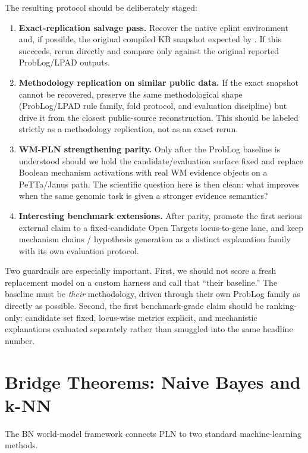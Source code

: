 \documentclass[11pt,openany]{report}
\begin{document}
The resulting protocol should be deliberately staged:
\begin{enumerate}
\item \textbf{Exact-replication salvage pass.}  Recover the native cplint
  environment and, if possible, the original compiled KB snapshot expected by
  .  If this succeeds, rerun
   directly and compare only against the original
  reported ProbLog/LPAD outputs.
\item \textbf{Methodology replication on similar public data.}  If the exact
  snapshot cannot be recovered, preserve the same methodological shape
  (ProbLog/LPAD rule family, fold protocol, and evaluation discipline) but
  drive it from the closest public-source reconstruction.  This should be
  labeled strictly as a methodology replication, not as an exact rerun.
\item \textbf{WM-PLN strengthening parity.}  Only after the ProbLog baseline is
  understood should we hold the candidate/evaluation surface fixed and replace
  Boolean mechanism activations with real WM evidence objects on a PeTTa/Janus
  path.  The scientific question here is then clean: what improves when the
  same genomic task is given a stronger evidence semantics?
\item \textbf{Interesting benchmark extensions.}  After parity, promote the
  first serious external claim to a fixed-candidate Open Targets locus-to-gene
  lane, and keep mechanism chains / hypothesis generation as a distinct
  explanation family with its own evaluation protocol.
\end{enumerate}

Two guardrails are especially important.  First, we should not score a fresh
replacement model on a custom harness and call that ``their baseline.''  The
baseline must be \emph{their} methodology, driven through their own ProbLog
family as directly as possible.  Second, the first benchmark-grade claim should
be ranking-only: candidate set fixed, locus-wise metrics explicit, and
mechanistic explanations evaluated separately rather than smuggled into the
same headline number.

\section{Bridge Theorems: Naive Bayes and k-NN}

The BN world-model framework connects PLN to two standard machine-learning
methods.
\end{document}
